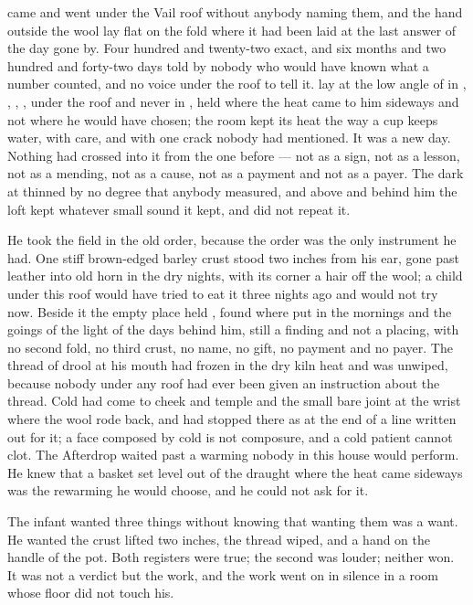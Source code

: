 
 came and went under the Vail roof without anybody naming them, and the hand outside the wool lay flat on the fold where it had been laid at the last answer of the day gone by. Four hundred and twenty-two exact, and six months and two hundred and forty-two days told by nobody who would have known what a number counted, and no voice under the roof to tell it.  lay at the low angle of  in , , , , under the roof and never in , held where the heat came to him sideways and not where he would have chosen; the room kept its heat the way a cup keeps water, with care, and with one crack nobody had mentioned. It was a new day. Nothing had crossed into it from the one before --- not as a sign, not as a lesson, not as a mending, not as a cause, not as a payment and not as a payer. The dark at  thinned by no degree that anybody measured, and above and behind him the loft kept whatever small sound it kept, and did not repeat it.

He took the field in the old order, because the order was the only instrument he had. One stiff brown-edged barley crust stood two inches from his ear, gone past leather into old horn in the dry nights, with its corner a hair off the wool; a child under this roof would have tried to eat it three nights ago and would not try now. Beside it the empty place held , found where put in the mornings and the goings of the light of the days behind him, still a finding and not a placing, with no second fold, no third crust, no name, no gift, no payment and no payer. The thread of drool at his mouth had frozen in the dry kiln heat and was unwiped, because nobody under any roof had ever been given an instruction about the thread. Cold had come to cheek and temple and the small bare joint at the wrist where the wool rode back, and had stopped there as at the end of a line written out for it; a face composed by cold is not composure, and a cold patient cannot clot. The Afterdrop waited past a warming nobody in this house would perform. He knew that a basket set level out of the draught where the heat came sideways was the rewarming he would choose, and he could not ask for it.

The infant wanted three things without knowing that wanting them was a want. He wanted the crust lifted two inches, the thread wiped, and a hand on the handle of the pot. Both registers were true; the second was louder; neither won. It was not a verdict but the work, and the work went on in silence in a room whose floor did not touch his.

